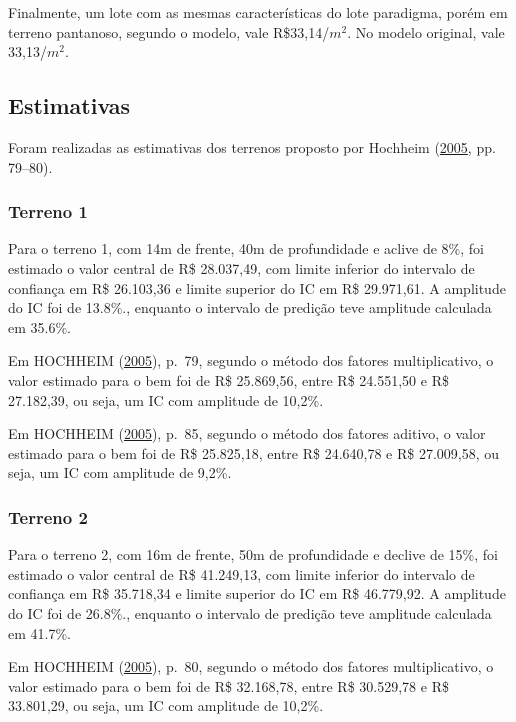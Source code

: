 \documentclass[a4paper, 12pt]{article}
\begin{document}
Finalmente, um lote com as mesmas características do lote paradigma,
porém em terreno pantanoso, segundo o modelo, vale R\$33,14/\(m^2\). No
modelo original, vale 33,13/\(m^2\).

\hypertarget{estimativas}{%
\subsection{Estimativas}\label{estimativas}}

Foram realizadas as estimativas dos terrenos proposto por Hochheim
(\protect\hyperlink{ref-hochheim2005}{2005}, pp. 79--80).

\hypertarget{terreno-1}{%
\subsubsection{Terreno 1}\label{terreno-1}}

Para o terreno 1, com 14m de frente, 40m de profundidade e aclive de
8\%, foi estimado o valor central de R\$ 28.037,49, com limite inferior
do intervalo de confiança em R\$ 26.103,36 e limite superior do IC em
R\$ 29.971,61. A amplitude do IC foi de 13.8\%., enquanto o intervalo de
predição teve amplitude calculada em 35.6\%.

Em HOCHHEIM (\protect\hyperlink{ref-hochheim2005}{2005}), p.~79, segundo
o método dos fatores multiplicativo, o valor estimado para o bem foi de
R\$ 25.869,56, entre R\$ 24.551,50 e R\$ 27.182,39, ou seja, um IC com
amplitude de 10,2\%.

Em HOCHHEIM (\protect\hyperlink{ref-hochheim2005}{2005}), p.~85, segundo
o método dos fatores aditivo, o valor estimado para o bem foi de R\$
25.825,18, entre R\$ 24.640,78 e R\$ 27.009,58, ou seja, um IC com
amplitude de 9,2\%.

\hypertarget{terreno-2}{%
\subsubsection{Terreno 2}\label{terreno-2}}

Para o terreno 2, com 16m de frente, 50m de profundidade e declive de
15\%, foi estimado o valor central de R\$ 41.249,13, com limite inferior
do intervalo de confiança em R\$ 35.718,34 e limite superior do IC em
R\$ 46.779,92. A amplitude do IC foi de 26.8\%., enquanto o intervalo de
predição teve amplitude calculada em 41.7\%.

Em HOCHHEIM (\protect\hyperlink{ref-hochheim2005}{2005}), p.~80, segundo
o método dos fatores multiplicativo, o valor estimado para o bem foi de
R\$ 32.168,78, entre R\$ 30.529,78 e R\$ 33.801,29, ou seja, um IC com
amplitude de 10,2\%.
\end{document}
